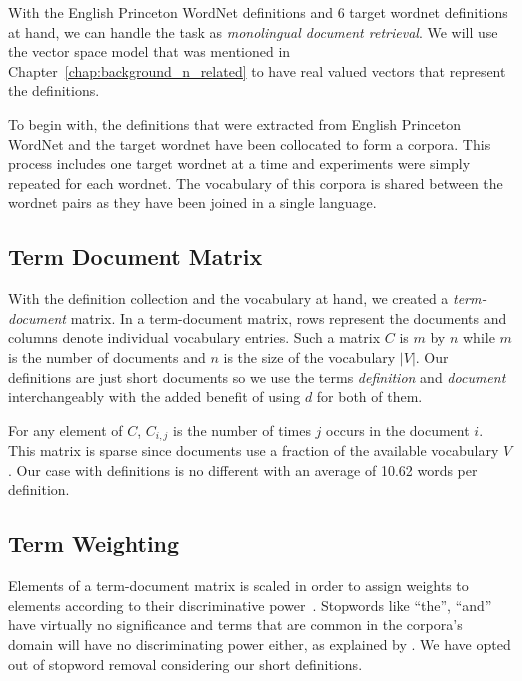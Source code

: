 With the English Princeton WordNet definitions and 6 target wordnet definitions at hand, we can handle the task as \emph{monolingual document retrieval}.
We will use the vector space model that was mentioned in Chapter~\ref{chap:background_n_related} to have real valued vectors that represent the definitions.

To begin with, the definitions that were extracted from English Princeton WordNet and the target wordnet have been collocated to form a corpora.
This process includes one target wordnet at a time and experiments were simply repeated for each wordnet.
The vocabulary of this corpora is shared between the wordnet pairs as they have been joined in a single language.

\subsection{Term Document Matrix}%
\label{sub:term_document_matrix}

With the definition collection and the vocabulary at hand, we created a \emph{term-document} matrix.
In a term-document matrix, rows represent the documents and columns denote individual vocabulary entries.
Such a matrix $C$ is $m$ by $n$ while $m$ is the number of documents and $n$ is the size of the vocabulary $|V|$.
Our definitions are just short documents so we use the terms \emph{definition} and \emph{document} interchangeably with the added benefit of using $d$ for both of them.

For any element of $C$, $C_{i,j}$ is the number of times $j$ occurs in the document $i$.
This matrix is sparse since documents use a fraction of the available vocabulary $V$.
Our case with definitions is no different with an average of 10.62 words per definition.

\subsection{Term Weighting}%
\label{sub:term_weighting}

Elements of a term-document matrix is scaled in order to assign weights to elements according to their discriminative power~\cite{manning_introduction_2009}.
Stopwords like \enquote{the}, \enquote{and} have virtually no significance and terms that are common in the corpora's domain will have no discriminating power either, as explained by \textcite{manning_introduction_2009}.
We have opted out of stopword removal considering our short definitions.

